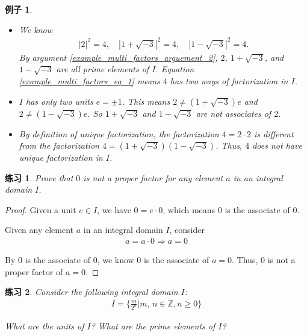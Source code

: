 \documentclass[utf8]{ctexbook}
\newtheorem{example}{例子}[section]
\newtheorem{exercise}{练习}[section]
\begin{document}
\begin{example}
\begin{enumerate}
{\begin{itemize}
\item{We know
\begin{align*}
|2|^2 = 4, \quad |1 + \sqrt{-3}|^2 = 4, \quad |1 - \sqrt{-3}|^2 = 4 .
\end{align*}
By argument \ref{example_multi_factors_arguement_2}, $2$, $1+ \sqrt{-3}$, and $1 - \sqrt{-3}$ are all prime elements of $I$. Equation \ref{example_multi_factors_eq_1} means $4$ has two ways of factorization in $I$.
}
\item{$I$ has only two units $e = \pm 1$. This means $ 2 \neq (1+ \sqrt{-3}) e $ and $2 \neq (1 - \sqrt{-3}) e$. So $1+ \sqrt{-3}$ and $1 - \sqrt{-3}$ are not associates of $2$. }
\item{By definition of unique factorization, the factorization $4 = 2 \cdot 2$ is different from the factorization $4 = (1+ \sqrt{-3} ) (1 - \sqrt{-3})$. Thus, $4$ does not have unique factorization in $I$.}
\end{itemize}
}

\end{enumerate}

\end{example}

\begin{exercise}
Prove that $0$ is not a proper factor for any element $a$ in an integral domain $I$. 
\end{exercise}

\begin{proof}
Given a unit $e \in I$, we have $ 0 = e \cdot 0$, which means $0$ is the associate of $0$.

Given any element $a $ in an integral domain $I$, consider
\begin{align*}
a = a \cdot 0 \Longrightarrow a = 0
\end{align*}

By $0$ is the associate of $0$, we know $0$ is the associate of $a=0$. Thus, $0$ is not a proper factor of $a = 0$.

\end{proof}


\begin{exercise}\label{integral_domain_unique_factorization_exercise_2}
Consider the following integral domain $I$:
\begin{align*}
I = \{ \frac{m}{2^n}  | m, \, n  \in \mathbb{Z}, n \geq 0 \}
\end{align*}

What are the units of $I$? What are the prime elements of $I$?
\end{exercise}
\end{document}
